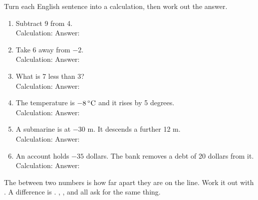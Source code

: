 \documentclass[12pt,a4paper]{article}
\begin{document}
\noindent Turn each English sentence into a calculation, then work out the answer.

\vspace{6pt}
\begin{enumerate}[label=\arabic*., itemsep=11pt]
  \item Subtract 9 from 4. \\[4pt]
        Calculation: \blank[6.2cm] \quad Answer: \blank[2.4cm]
  \item Take 6 away from $-2$. \\[4pt]
        Calculation: \blank[6.2cm] \quad Answer: \blank[2.4cm]
  \item What is 7 less than 3? \\[4pt]
        Calculation: \blank[6.2cm] \quad Answer: \blank[2.4cm]
  \item The temperature is $-8\,^{\circ}\mathrm{C}$ and it rises by 5 degrees. \\[4pt]
        Calculation: \blank[6.2cm] \quad Answer: \blank[2.4cm]
  \item A submarine is at $-30$ m. It descends a further 12 m. \\[4pt]
        Calculation: \blank[6.2cm] \quad Answer: \blank[2.4cm]
  \item An account holds $-35$ dollars. The bank removes a debt of 20 dollars from it.
        \\[4pt]
        Calculation: \blank[6.2cm] \quad Answer: \blank[2.4cm]
\end{enumerate}


\begin{remember}
  The  between two numbers is how far apart they are on the line.
  Work it out with . A difference is .
  , ,  and
   all ask for the same thing.
\end{remember}
\end{document}
